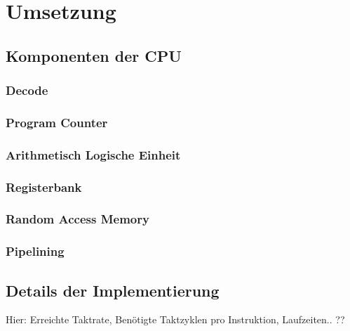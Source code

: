 \chapter{Umsetzung} %
\label{Umsetzung} %

\section{Komponenten der CPU}
\subsection{Decode}
\subsection{Program Counter}
\subsection{Arithmetisch Logische Einheit}
\subsection{Registerbank}
\subsection{Random Access Memory}
\subsection{Pipelining}

\section{Details der Implementierung}
Hier: Erreichte Taktrate, Benötigte Taktzyklen pro
Instruktion, Laufzeiten.. ??
